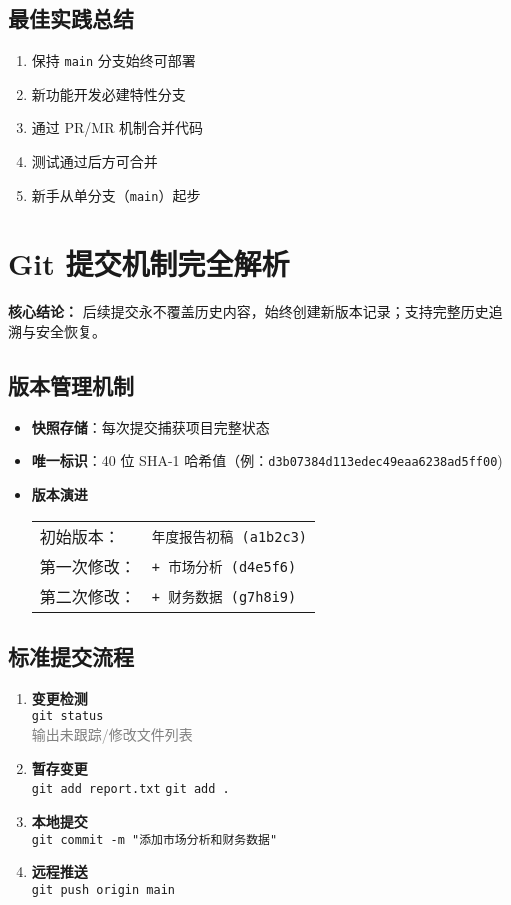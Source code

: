 \subsection{最佳实践总结}
\begin{enumerate}[leftmargin=*, nosep]
    \item 保持 \texttt{main} 分支始终可部署
    \item 新功能开发必建特性分支
    \item 通过 PR/MR 机制合并代码
    \item 测试通过后方可合并
    \item 新手从单分支（\texttt{main}）起步
\end{enumerate}

\section{Git 提交机制完全解析}
\textbf{核心结论：}  
后续提交永不覆盖历史内容，始终创建新版本记录；支持完整历史追溯与安全恢复。

\subsection{版本管理机制}
\begin{itemize}[leftmargin=*, nosep]
    \item \textbf{快照存储}：每次提交捕获项目完整状态
    \item \textbf{唯一标识}：40 位 SHA-1 哈希值（例：\texttt{d3b07384d113edec49eaa6238ad5ff00})
    \item \textbf{版本演进} \\
    \begin{tabular}{@{}ll@{}}
        初始版本： & \texttt{年度报告初稿 (a1b2c3)} \\
        第一次修改： & \texttt{+ 市场分析 (d4e5f6)} \\
        第二次修改： & \texttt{+ 财务数据 (g7h8i9)} \\
    \end{tabular}
\end{itemize}

\subsection{标准提交流程}
\begin{enumerate}[leftmargin=*, nosep]
    \item \textbf{变更检测} \\
    \texttt{git status} \\
    \textcolor{gray}{输出未跟踪/修改文件列表}
    
    \item \textbf{暂存变更} \\
    \texttt{git add report.txt} \quad {} \quad \texttt{git add .}
    
    \item \textbf{本地提交} \\
    \texttt{git commit -m "添加市场分析和财务数据"}
    
    \item \textbf{远程推送} \\
    \texttt{git push origin main}
\end{enumerate}

